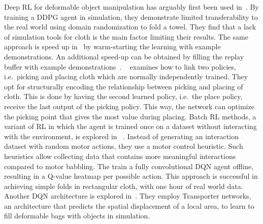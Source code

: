 \documentclass[\home/main.tex]{subfiles}
\begin{document}
Deep RL for deformable object manipulation has arguably first been used in~\autocite{Matas2018}. By training a DDPG agent in simulation, they demonstrate limited transferability to the real world using domain randomization to fold a towel. They find that a lack of simulation tools for cloth is the main factor limiting their results. The same approach is speed up in~\autocite{Jangir2020} by warm-starting the learning with example demonstrations. An additional speed-up can be obtained by filling the replay buffer with example demonstrations~\autocite{Tsurumine2019}. ~\textcite{Wu2020} examines how to link two policies, i.e.\ picking and placing cloth which are normally independently trained. They opt for structurally encoding the relationship between picking and placing of cloth. This is done by having the second learned policy, i.e.\ the place policy, receive the last output of the picking policy. This way, the network can optimize the picking point that gives the most value during placing. Batch RL methods, a variant of RL in which the agent is trained once on a dataset without interacting with the environment, is explored in ~\autocite{lee2020learning}. Instead of generating an interaction dataset with random motor actions, they use a motor control heuristic. Such heuristics allow collecting data that contains more meaningful interactions compared to motor babbling. The train a fully convolutional DQN agent offline, resulting in a Q-value heatmap per possible action. This approach is successful in achieving simple folds in rectangular cloth, with one hour of real world data. Another DQN architecture is explored in~\autocite{seita2021learning}. They employ Transporter networks, an architecture that predicts the spatial displacement of a local area, to learn to fill deformable bags with objects in simulation.
\end{document}
